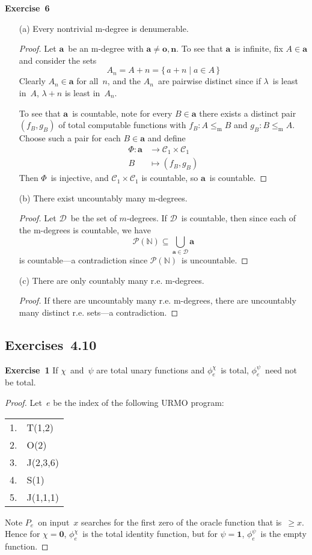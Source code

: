 \documentclass[letterpaper]{article}
\newcommand{\exercise}[2][]{\noindent\textbf{Exercise~{#2}}\ifthenelse{\isempty{#1}}{\textbf{.}}{ ({#1})\textbf{.}}}
\newcommand{\C}{\mathcal{C}}
\newcommand{\D}{\mathcal{D}}
\newcommand{\N}{\mathbb{N}}
\renewcommand{\P}{\mathcal{P}}
\newcommand{\mr}{\mathrel{\le_{\mathrm{m}}}}
\newcommand{\dg}[1]{\mathbf{{#1}}}
\newcommand{\bigunion}{\bigcup}
\theoremstyle{plain}
\theoremstyle{definition}
\theoremstyle{remark}
\begin{document}
\exercise{6}
\begin{enumerate}[itemsep=0pt]
\item[(a)] Every nontrivial m-degree is denumerable.
\begin{proof}
Let $\dg{a}$~be an m-degree with $\dg{a}\ne\dg{o},\dg{n}$. To see that $\dg{a}$~is infinite, fix $A\in\dg{a}$ and consider the sets
$$A_n=A+n=\{\,a+n\mid a\in A\,\}$$
Clearly $A_n\in\dg{a}$ for all~$n$, and the $A_n$~are pairwise distinct since if $\lambda$~is least in~$A$, $\lambda+n$ is least in~$A_n$.

To see that $\dg{a}$~is countable, note for every $B\in\dg{a}$ there exists a distinct pair $(f_B,g_B)$ of total computable functions with $f_B:A\mr B$ and $g_B:B\mr A$. Choose such a pair for each $B\in\dg{a}$ and define
\begin{align*}
\Phi:\dg{a}&\to\C_1\times\C_1\\
	B&\mapsto(f_B,g_B)
\end{align*}
Then $\Phi$~is injective, and $\C_1\times\C_1$ is countable, so $\dg{a}$~is countable.
\end{proof}

\item[(b)] There exist uncountably many m-degrees.
\begin{proof}
Let $\D$~be the set of $m$-degrees. If $\D$~is countable, then since each of the m-degrees is countable, we have
$$\P(\N)\subseteq\bigunion_{\dg{a}\in\D}\dg{a}$$
is countable---a contradiction since $\P(\N)$~is uncountable.
\end{proof}

\item[(c)] There are only countably many r.e. m-degrees.
\begin{proof}
If there are uncountably many r.e. m-degrees, there are uncountably many distinct r.e. sets---a contradiction.
\end{proof}
\end{enumerate}

\subsection*{Exercises~4.10}
\exercise{1}
If $\chi$~and~$\psi$ are total unary functions and $\phi_e^\chi$~is total, $\phi_e^\psi$~need not be total.
\begin{proof}
Let~$e$ be the index of the following URMO program:
\begin{center}
\begin{tabular}{rl}
1.&T(1,2)\\
2.&O(2)\\
3.&J(2,3,6)\\
4.&S(1)\\
5.&J(1,1,1)
\end{tabular}
\end{center}
Note $P_e$~on input~$x$ searches for the first zero of the oracle function that is~$\ge x$. Hence for $\chi=\mathbf{0}$, $\phi_e^\chi$~is the total identity function, but for $\psi=\mathbf{1}$, $\phi_e^\psi$~is the empty function.
\end{proof}
\end{document}
